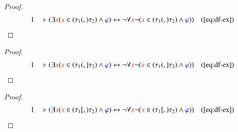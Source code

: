 \begin{proof}\label{proof:bl.excc}
\begin{align}
  1 &&  & \vdash ( \exists \msc{x} ( \msc{x} \in ( \tau_1 (,) \tau_2 ) \wedge
      \mw{\varphi} ) \leftrightarrow \lnot \forall \msc{x}
      \lnot ( \msc{x} \in ( \tau_1 (,) \tau_2 ) \wedge
      \mw{\varphi} ) )&(\mbox{\ref{eq:df-ex}})\notag
\end{align}
\end{proof}

\blexcd

\begin{proof}\label{proof:bl.excd}
\begin{align}
  1 &&  & \vdash ( \exists \msc{x} ( \msc{x} \in ( \tau_1 (,] \tau_2 ) \wedge
      \mw{\varphi} ) \leftrightarrow \lnot \forall \msc{x}
      \lnot ( \msc{x} \in ( \tau_1 (,] \tau_2 ) \wedge
      \mw{\varphi} ) )&(\mbox{\ref{eq:df-ex}})\notag
\end{align}
\end{proof}

\blexdc

\begin{proof}\label{proof:bl.exdc}
\begin{align}
  1 &&  & \vdash ( \exists \msc{x} ( \msc{x} \in ( \tau_1 [,) \tau_2 ) \wedge
      \mw{\varphi} ) \leftrightarrow \lnot \forall \msc{x}
      \lnot ( \msc{x} \in ( \tau_1 [,) \tau_2 ) \wedge
      \mw{\varphi} ) )&(\mbox{\ref{eq:df-ex}})\notag
\end{align}
\end{proof}

